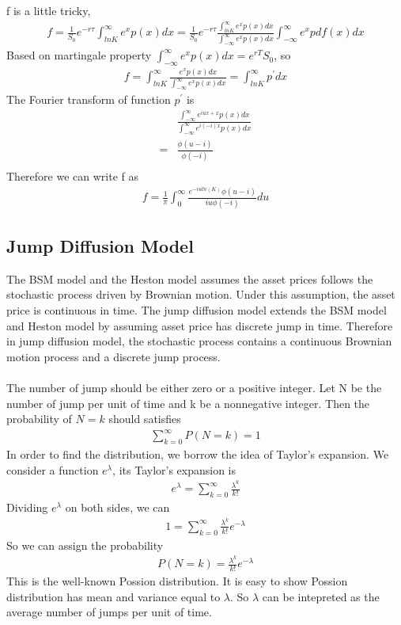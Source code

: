 \documentclass[a4paper]{article}
\begin{document}
f is a little tricky, 
\begin{align*}
        f = \frac{1}{S_0} e^{-r \tau}\int_{lnK}^{\infty} e^x p(x) dx
	  = \frac{1}{S_0} e^{-r \tau}\frac{\int_{lnK}^{\infty} e^x p(x) dx}{\int_{-\infty}^{\infty} e^x p(x) dx}
	  \int_{-\infty}^{\infty} e^x pdf(x) dx
\end{align*}
Based on martingale property $\int_{-\infty}^{\infty} e^x p(x) dx = e^{rT}S_0$, so
\begin{align*}
	f = \int_{lnK}^{\infty} \frac{e^x p(x) dx}{\int_{-\infty}^{\infty} e^x p(x) dx}
	 =  \int_{lnK}^{\infty} {p}^{'} dx
\end{align*}
The Fourier transform of function ${p}^{'}$ is
\begin{align*}
	&\frac{\int_{-\infty}^{\infty} e^{iux + x}p(x)dx}{\int_{-\infty}^{\infty} e^{i(-i)x} p(x) dx} \\
	=&\frac{\phi(u-i)}{\phi(-i)}\\
\end{align*}
Therefore we can write f as
\begin{align*}
	f = \frac{1}{\pi}\int_0^{\infty}\frac{e^{-iuln(K)}\phi(u-i)}{iu\phi(-i)}du
\end{align*}
\subsection{Jump Diffusion Model}
The BSM model and the Heston model assumes the asset prices follows the stochastic process driven by Brownian motion. Under this assumption, the asset price is continuous in time. The jump diffusion model extends the BSM model and Heston model by assuming asset price has discrete jump in time. Therefore in jump diffusion model, the stochastic process contains a continuous Brownian motion process and a discrete jump process.\\

\\
The number of jump should be either zero or a positive integer. Let N be the number of jump per unit of time and k be a nonnegative integer. Then the probability of $N = k$ should satisfies
\begin{align*}
	\sum_{k = 0}^\infty P(N = k) = 1
\end{align*}
In order to find the distribution, we borrow the idea of Taylor's expansion. We consider a function $e^{\lambda}$, its Taylor's expansion is
\begin{align*}
	e^{\lambda} = \sum_{k = 0}^\infty \frac{\lambda^k}{k!}
\end{align*}
Dividing $e^{\lambda}$ on both sides, we can
\begin{align*}
	1 = \sum_{k = 0}^\infty \frac{\lambda^k}{k!}e^{-\lambda} 
\end{align*}
So we can assign the probability
\begin{align*}
P(N = k) = \frac{\lambda^k}{k!}e^{-\lambda}
\end{align*}
This is the well-known Possion distribution. It is easy to show Possion distribution has mean and variance equal to $\lambda$. So $\lambda$ can be intepreted as the average number of jumps per unit of time.\\
\end{document}
